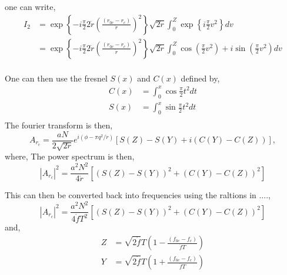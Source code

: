 one can write,
\begin{equation}
\begin{split}
I_2 & = \exp{\left\{  - i \frac{\pi}{2} 2 \dot{r} \left(\frac{(r_{0c} - r_c)}{\dot{r}}\right)^2 \right\}} \sqrt{2\dot{r}}  \int_{0}^{Z} \exp{\left\{i \frac{\pi}{2} v^2\right\}} dv \\
& = \exp{\left\{  - i \frac{\pi}{2} 2 \dot{r} \left(\frac{(r_{0c} - r_c)}{\dot{r}}\right)^2 \right\}} \sqrt{2\dot{r}}  \int_{0}^{Z} 
\cos{\left(  \frac{\pi}{2} v^2 \right)} + i\sin{\left(  \frac{\pi}{2} v^2 \right)} dv \\
\end{split}
\end{equation}

One can then use the fresnel $S(x)$ and $C(x)$ defined by,
\begin{equation}
\begin{split}
C(x) &= \int_0^x \cos{\frac{\pi}{2} t^2} dt \\
S(x) &= \int_0^x \sin{\frac{\pi}{2} t^2} dt \\
\end{split}
\end{equation}
The fourier transform is then,
\begin{equation}
A_{r_c} = \frac{aN}{2\sqrt{2\dot{r}}} e^{i(\phi - \pi q^2/\dot{r})} \left[ S(Z) -  S(Y) + i(C(Y) - C(Z))   \right],
\end{equation}
where,
The power spectrum is then,
\begin{equation}
|A_{r_c}|^2 = \frac{a^2 N^2}{4\dot{r}}  \left[ (S(Z) -  S(Y))^2 + (C(Y) - C(Z))^2   \right]
\end{equation}

This can then be converted back into frequencies using the raltions in ....,
\begin{equation}
\label{app1:power_fresnel}
|A_{r_c}|^2 = \frac{a^2 N^2}{4\dot{f}T^2}  \left[ (S(Z) -  S(Y))^2 + (C(Y) - C(Z))^2   \right]
\end{equation}
and,
\begin{equation}
\begin{split}
Z &= \sqrt{2\dot{f}}T\left( 1 - \frac{(f_{0c} - f_c)}{\dot{f}T}  \right) \\
Y &= \sqrt{2\dot{f}}T\left( 1 + \frac{(f_{0c} - f_c)}{\dot{f}T}  \right) \\
\end{split}
\end{equation}

